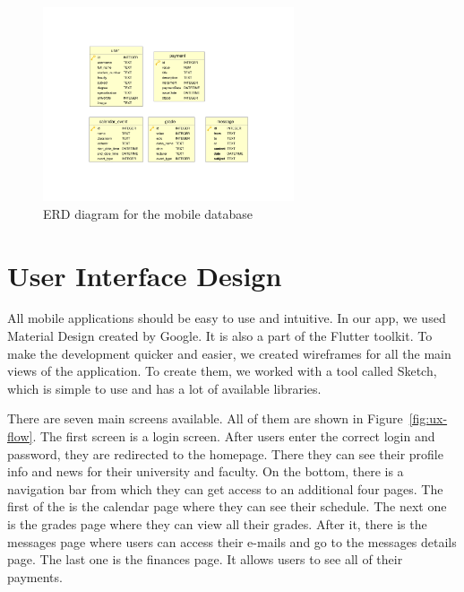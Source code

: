 \begin{figure}[htb]
    \centering
    \includegraphics[width=0.66\textwidth]{fig03/erd_diagram.pdf}
    \caption{ERD diagram for the mobile database}
    \label{fig:erd-diagram}
\end{figure}

\section{User Interface Design}

All mobile applications should be easy to use and intuitive. In our app, we used Material Design created by Google. It is also a part of the Flutter toolkit. To make the development quicker and easier, we created wireframes for all the main views of the application. To create them, we worked with a tool called Sketch, which is simple to use and has a lot of available libraries.

There are seven main screens available. All of them are shown in Figure~\ref{fig:ux-flow}. The first screen is a login screen. After users enter the correct login and password, they are redirected to the homepage. There they can see their profile info and news for their university and faculty. On the bottom, there is a navigation bar from which they can get access to an additional four pages. The first of the is the calendar page where they can see their schedule. The next one is the grades page where they can view all their grades. After it, there is the messages page where users can access their e-mails and go to the messages details page. The last one is the finances page. It allows users to see all of their payments.

